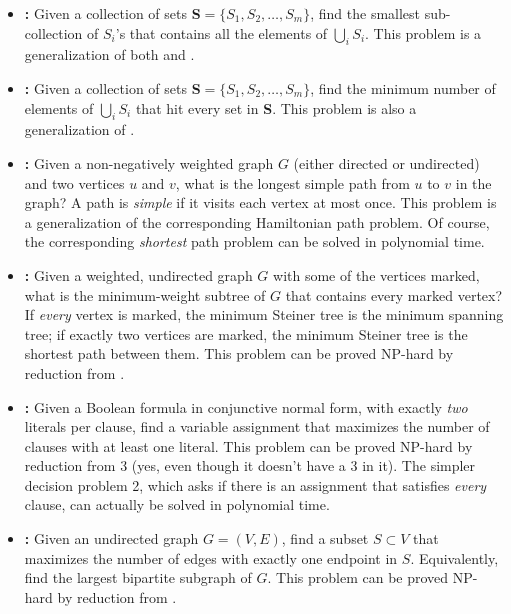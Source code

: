 \begin{itemize}
Despite the similar names, this problem is \textit{very} different from ; sorry, I didn’t make up the names.
This problem can be proved NP-hard by reduction from , because it has a 3 in it.
Unlike , the  problem is \textit{strongly} NP-hard; it remains NP-hard even if every input number is at most $n^3$.
\item \textbf{:} Given a collection of sets \textbf{S}${} = \{S_1, S_2, \dots, S_m\}$, find the smallest sub-collection of $S_i$’s that contains all the elements of $\bigcup_i S_i$.
This problem is a generalization of both  and .
\item \textbf{:} Given a collection of sets \textbf{S}${} = \{S_1, S_2, \dots, S_m\}$, find the minimum number of elements of $\bigcup_i S_i$ that hit every set in \textbf{S}.
This problem is also a generalization of .
\item \textbf{:} Given a non-negatively weighted graph $G$ (either directed or undirected) and two vertices $u$ and $v$, what is the longest simple path from $u$ to $v$ in the graph?
A path is \textit{simple} if it visits each vertex at most once.
This problem is a generalization of the corresponding Hamiltonian path problem.
Of course, the corresponding \textit{shortest} path problem can be solved in polynomial time.
\item \textbf{:} Given a weighted, undirected graph $G$ with some of the vertices marked, what is the minimum-weight subtree of $G$ that contains every marked vertex?
If \textit{every} vertex is marked, the minimum Steiner tree is the minimum spanning tree; if exactly two vertices are marked, the minimum Steiner tree is the shortest path between them.
This problem can be proved NP-hard by reduction from .
\item \textbf{:} Given a Boolean formula in conjunctive normal form, with exactly \textit{two} literals per clause, find a variable assignment that maximizes the number of clauses with at least one  literal.
This problem can be proved NP-hard by reduction from 3 (yes, even though it doesn’t have a 3 in it).
The simpler decision problem 2, which asks if there is an assignment that satisfies \textit{every} clause, can actually be solved in polynomial time.
\item \textbf{:} Given an undirected graph $G = (V, E)$, find a subset $S \subset V$ that maximizes the number of edges with exactly one endpoint in $S$.
Equivalently, find the largest bipartite subgraph of $G$.
This problem can be proved NP-hard by reduction from .
\end{itemize}

